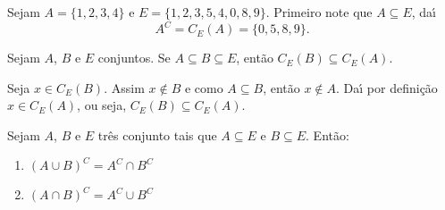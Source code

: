 \begin{exemplo}
	Sejam $A = \{1,2,3,4\}$ e $E = \{1,2,3,5,4,0,8,9\}$. Primeiro note que $A \subseteq E$, da{\'\i}
	\[
			A^C = C_E(A) = \{0,5,8,9\}.
	\]
\end{exemplo}

\begin{proposicao}
	Sejam $A$, $B$ e $E$ conjuntos. Se $A\subseteq B\subseteq E$, ent{\~a}o $C_E(B)\subseteq C_E(A)$.
\end{proposicao}
\begin{prova}
	Seja $x \in C_E(B)$. Assim $x\notin B$ e como $A \subseteq B$, ent\~ao $x \notin A$. Da{\'\i} por defini\c{c}\~ao $x\in C_E(A)$, ou seja, $C_E(B) \subseteq C_E(A)$.
\end{prova}

\begin{proposicao} Sejam $A$, $B$ e $E$ tr{\^e}s conjunto tais que $A\subseteq E$ e $B\subseteq E$. Ent{\~a}o:
\begin{enumerate}[label={\roman*})]
	\item $(A\cup B)^C = A^C\cap B^C$
	\item $(A\cap B)^C = A^C\cup B^C$
\end{enumerate}
\end{proposicao}
